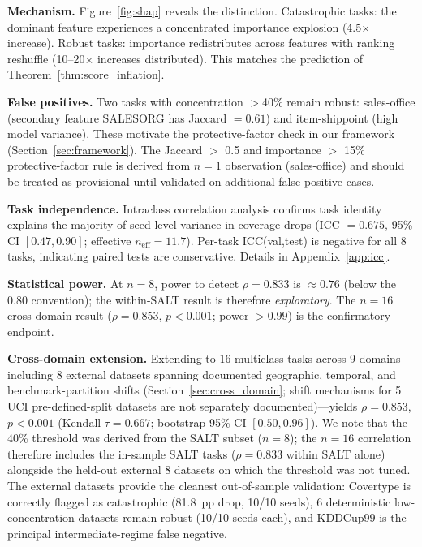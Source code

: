 \documentclass{uai2026} %
\begin{document}
\textbf{Mechanism.} Figure~\ref{fig:shap} reveals the distinction. Catastrophic tasks: the dominant feature experiences a concentrated importance explosion (4.5$\times$ increase). Robust tasks: importance redistributes across features with ranking reshuffle (10--20$\times$ increases distributed). This matches the prediction of Theorem~\ref{thm:score_inflation}.

\textbf{False positives.} Two tasks with concentration $>$40\% remain robust: sales-office (secondary feature SALESORG has Jaccard $= 0.61$) and item-shippoint (high model variance). These motivate the protective-factor check in our framework (Section~\ref{sec:framework}). The Jaccard $>$ 0.5 and importance $>$ 15\% protective-factor rule is derived from $n=1$ observation (sales-office) and should be treated as provisional until validated on additional false-positive cases.

\textbf{Task independence.} Intraclass correlation analysis confirms task identity explains the majority of seed-level variance in coverage drops (ICC $= 0.675$, 95\% CI $[0.47, 0.90]$; effective $n_{\text{eff}} = 11.7$). Per-task ICC(val,test) is negative for all 8 tasks, indicating paired tests are conservative. Details in Appendix~\ref{app:icc}.

\textbf{Statistical power.} At $n=8$, power to detect $\rho = 0.833$ is $\approx 0.76$ (below the 0.80 convention); the within-SALT result is therefore \textit{exploratory}. The $n=16$ cross-domain result ($\rho=0.853$, $p<0.001$; power $>0.99$) is the confirmatory endpoint.

\textbf{Cross-domain extension.} Extending to 16 multiclass tasks across 9 domains---including 8 external datasets spanning documented geographic, temporal, and benchmark-partition shifts (Section~\ref{sec:cross_domain}; shift mechanisms for 5 UCI pre-defined-split datasets are not separately documented)---yields $\rho=0.853$, $p < 0.001$ (Kendall $\tau = 0.667$; bootstrap 95\% CI $[0.50, 0.96]$). We note that the 40\% threshold was derived from the SALT subset ($n=8$); the $n=16$ correlation therefore includes the in-sample SALT tasks ($\rho=0.833$ within SALT alone) alongside the held-out external 8 datasets on which the threshold was not tuned. The external datasets provide the cleanest out-of-sample validation: Covertype is correctly flagged as catastrophic (81.8~pp drop, 10/10 seeds), 6 deterministic low-concentration datasets remain robust (10/10 seeds each), and KDDCup99 is the principal intermediate-regime false negative.
\end{document}
